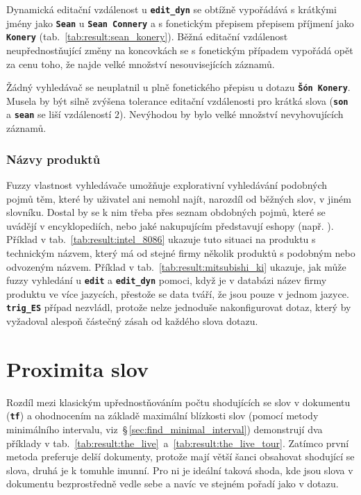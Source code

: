 \documentclass[11pt,letterpaper,oneside,openright]{book}
\newcommand{\bftt}[1]{\texttt{\textbf{#1}}}
\begin{document}
\mbox{}\mbox{}

Dynamická editační vzdálenost u \bftt{edit\_dyn} se obtížně vypořádává s
krátkými jmény jako \bftt{Sean} u \bftt{Sean Connery} a s fonetickým přepisem
přepisem příjmení jako \bftt{Konery} (tab.~\ref{tab:result:sean_konery}). Běžná
editační vzdálenost neupřednostňující změny na koncovkách se s fonetickým
případem vypořádá opět za cenu toho, že najde velké množství nesouvisejících
záznamů.

Žádný vyhledávač se neuplatnil u plně fonetického přepisu u dotazu \bftt{Šón
Konery}. Musela by být silně zvýšena tolerance editační vzdálenosti pro krátká
slova (\bftt{son} a \bftt{sean} se liší vzdáleností $2$). Nevýhodou by bylo velké
množství nevyhovujících záznamů.

\subsubsection{Názvy produktů}

\mbox{}\mbox{}

Fuzzy vlastnost vyhledávače umožňuje explorativní vyhledávání podobných pojmů
těm, které by uživatel ani nemohl najít, narozdíl od běžných slov, v jiném
slovníku. Dostal by se k nim třeba přes seznam obdobných pojmů, které se
uvádějí v encyklopediích, nebo jaké nakupujícím představují eshopy (např.
). Příklad v tab.~\ref{tab:result:intel_8086}
ukazuje tuto situaci na produktu s technickým názvem, který má od stejné firmy
několik produktů s podobným nebo odvozeným názvem. Příklad v
tab.~\ref{tab:result:mitsubishi_ki} ukazuje, jak může fuzzy vyhledání u
\bftt{edit} a \bftt{edit\_dyn} pomoci, když je v databázi název firmy produktu
ve více jazycích, přestože se data tváří, že jsou pouze v jednom jazyce.
\bftt{trig\_ES} případ nezvládl, protože nelze jednoduše nakonfigurovat dotaz,
který by vyžadoval alespoň částečný zásah od každého slova dotazu.

\mbox{}\mbox{}




\section{Proximita slov}
Rozdíl mezi klasickým upřednostňováním počtu shodujících se slov v dokumentu
(\bftt{tf}) a ohodnocením na základě maximální blízkosti slov (pomocí metody
minimálního intervalu, viz~\S\,\ref{sec:find_minimal_interval}) demonstrují dva
příklady v tab.~\ref{tab:result:the_live}~a~\ref{tab:result:the_live_tour}.
Zatímco první metoda preferuje delší dokumenty, protože mají větší šanci
obsahovat shodující se slova, druhá je k tomuhle imunní. Pro ni je ideální
taková shoda, kde jsou slova v dokumentu bezprostředně vedle sebe a navíc ve
stejném pořadí jako v dotazu.
\end{document}
